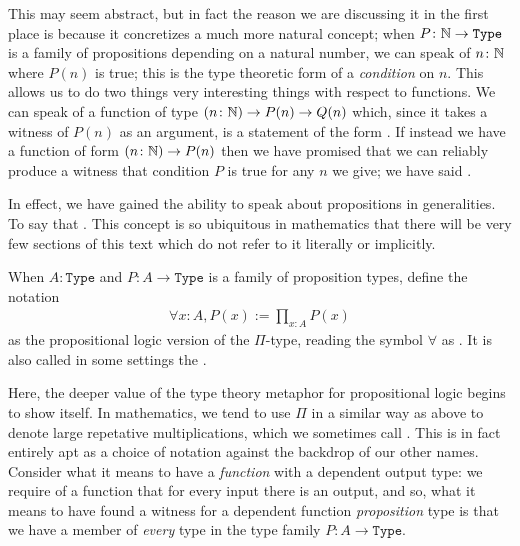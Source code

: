 \documentclass[11pt]{article}
\begin{document}
This may seem abstract, but in fact the reason we are discussing it in the first place is because it concretizes a much more natural concept; when $P \colon \mathbb{N} \to \mathtt{Type}$ is a family of propositions depending on a natural number, we can speak of $n \colon \mathbb{N}$ where $P(n)$ is true; this is the type theoretic form of a \emph{condition} on $n$. This allows us to do two things very interesting things with respect to functions. We can speak of a function of type $(n \colon \mathbb{N}) \to P(n) \to Q(n)$ which, since it takes a witness of $P(n)$ as an argument, is a statement of the form . If instead we have a function of form $(n \colon \mathbb{N}) \to P(n)$ then we have promised that we can reliably produce a witness that condition $P$ is true for any $n$ we give; we have said .

In effect, we have gained the ability to speak about propositions in generalities. To say that . This concept is so ubiquitous in mathematics that there will be very few sections of this text which do not refer to it literally or implicitly.

\begin{notation}
When $A\colon \mathtt{Type}$ and $P\colon A \to \mathtt{Type}$ is a family of proposition types, define the notation \begin{gather*}
\forall x : A, P(x) := \prod_{x : A} P(x)
\end{gather*}
as the propositional logic version of the $\Pi$-type, reading the symbol $\forall$ as . It is also called in some settings the .
\end{notation}

Here, the deeper value of the type theory metaphor for propositional logic begins to show itself. In mathematics, we tend to use $\Pi$ in a similar way as above to denote large repetative multiplications, which we sometimes call . This is in fact entirely apt as a choice of notation against the backdrop of our other names. Consider what it means to have a \emph{function} with a dependent output type: we require of a function that for every input there is an output, and so, what it means to have found a witness for a dependent function \emph{proposition} type is that we have a member of \emph{every} type in the type family $P\colon A \to \mathtt{Type}$.
\end{document}
